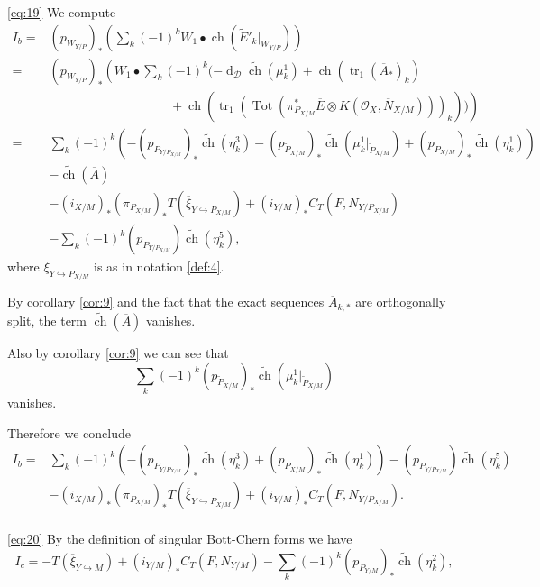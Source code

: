 \documentclass[10pt,twoside]{article}
\numberwithin{equation}{section}
\theoremstyle{plain}
\theoremstyle{definition}
\DeclareMathOperator{\tr}{tr}
\DeclareMathOperator{\Tot}{Tot}
\DeclareMathOperator{\dd}{d}
\DeclareMathOperator{\ch}{ch}
\begin{document}
\eqref{eq:19} We compute 
\begin{align*}
  I_{b}=&(p_{W_{Y/P}})_{\ast} \left(\sum_{k}(-1)^{k}W_{1} \bullet \ch(\widetilde
    E'_{k}|_{W_{Y/P}})\right)\\
  = &(p_{W_{Y/P}})_{\ast} \left(W_{1} \bullet \sum_{k}(-1)^{k}(-\dd_{\mathcal{D}}
    \widetilde{\ch} (\mu^{1} _{k})+ \ch(\tr_{1}(\overline A_{\ast})_{k})\right.\\
  &\left.\phantom{(p_{W_{Y/P}})_{\ast} \sum_{k}(-1)^{k}}
    +\ch(\tr_{1}(\Tot (\pi _{P_{X/M}}^{\ast}\overline E \otimes
    K(\mathcal{O}_{X},\overline N_{X/M})))_{k}))\right)\\
  =&\sum_{k}(-1)^{k}
  (-(p_{P_{Y/P_{X/M}}})_{\ast}\widetilde{\ch}(\eta^{3}_{k})-
  (p_{\widetilde P_{X/M}})_{\ast}\widetilde {\ch}(\mu^{1} _{k}|_{\widetilde P_{X/M}})
  +(p_{P_{X/M}})_{\ast}\widetilde{\ch}(\eta^{1}_{k}))\\
  & -\widetilde {\ch}(\overline A)\\
  &-(i_{X/M})_{\ast}(\pi _{P_{X/M}})_{\ast}
  T(\overline \xi_{Y\hookrightarrow P_{X/M}})+(i_{Y/M})_{\ast}C_{T}(F,N_{Y/P_{X/M}})\\
  &-\sum_{k}(-1)^{k} (p_{P_{Y/P_{X/M}}}) \widetilde {\ch}(\eta^{5}_{k}),
\end{align*}
where $\xi_{Y\hookrightarrow P_{X/M}}$ is as in notation \ref{def:4}.

By corollary \ref{cor:9} and the fact that the exact sequences
$\overline A_{k,\ast}$ are orthogonally split, the term $\widetilde
{\ch}(\overline A)$ vanishes. 

Also by corollary \ref{cor:9} we can see that $$ 
\sum_{k}(-1)^{k}
  (p_{\widetilde P_{X/M}})_{\ast}\widetilde {\ch}(\mu^{1} _{k}|_{\widetilde P_{X/M}})
$$
vanishes. 

Therefore we conclude
\begin{align*}
  I_{b}
  =&\sum_{k}(-1)^{k}
  (-(p_{P_{Y/P_{X/M}}})_{\ast}\widetilde{\ch}(\eta^{3}_{k})
  +(p_{P_{X/M}})_{\ast}\widetilde{\ch}(\eta^{1}_{k}))
  -(p_{P_{Y/P_{X/M}}}) \widetilde {\ch}(\eta^{5}_{k})\\
  &-(i_{X/M})_{\ast}(\pi _{P_{X/M}})_{\ast}
  T(\overline \xi_{Y\hookrightarrow P_{X/M}})+(i_{Y/M})_{\ast}C_{T}(F,N_{Y/P_{X/M}}).\\
\end{align*}


 
\eqref{eq:20} By the definition of singular Bott-Chern forms we have
\begin{displaymath}
  I_{c}=-T(\overline \xi_{Y\hookrightarrow M})+(i_{Y/M})_{\ast}C_{T}(F,N_{Y/M})
  -\sum_{k}(-1)^{k} (p_{P_{Y/M}})_{\ast}\widetilde{\ch}(\eta^{2}_{k}),
\end{displaymath}
\end{document}
